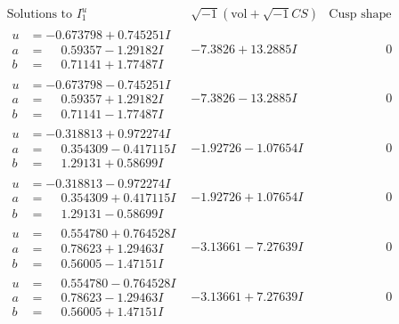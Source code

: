 \documentclass[1p]{elsarticle_modified}
\theoremstyle{definition}
\newcommand{\I}{\sqrt{-1}}
\begin{document}
$$\begin{array}{c|c|c}  
\text{Solutions to }I^u_{1}& \I (\text{vol} + \sqrt{-1}CS) & \text{Cusp shape}\\
 \hline 
\begin{aligned}
u &= -0.673798 + 0.745251 I \\
a &= \phantom{-}0.59357 - 1.29182 I \\
b &= \phantom{-}0.71141 + 1.77487 I\end{aligned}
 & -7.3826 + 13.2885 I & \phantom{-0.000000 } 0 \\ \hline\begin{aligned}
u &= -0.673798 - 0.745251 I \\
a &= \phantom{-}0.59357 + 1.29182 I \\
b &= \phantom{-}0.71141 - 1.77487 I\end{aligned}
 & -7.3826 - 13.2885 I & \phantom{-0.000000 } 0 \\ \hline\begin{aligned}
u &= -0.318813 + 0.972274 I \\
a &= \phantom{-}0.354309 - 0.417115 I \\
b &= \phantom{-}1.29131 + 0.58699 I\end{aligned}
 & -1.92726 - 1.07654 I & \phantom{-0.000000 } 0 \\ \hline\begin{aligned}
u &= -0.318813 - 0.972274 I \\
a &= \phantom{-}0.354309 + 0.417115 I \\
b &= \phantom{-}1.29131 - 0.58699 I\end{aligned}
 & -1.92726 + 1.07654 I & \phantom{-0.000000 } 0 \\ \hline\begin{aligned}
u &= \phantom{-}0.554780 + 0.764528 I \\
a &= \phantom{-}0.78623 + 1.29463 I \\
b &= \phantom{-}0.56005 - 1.47151 I\end{aligned}
 & -3.13661 - 7.27639 I & \phantom{-0.000000 } 0 \\ \hline\begin{aligned}
u &= \phantom{-}0.554780 - 0.764528 I \\
a &= \phantom{-}0.78623 - 1.29463 I \\
b &= \phantom{-}0.56005 + 1.47151 I\end{aligned}
 & -3.13661 + 7.27639 I & \phantom{-0.000000 } 0 \\ \hline\begin{aligned}

\end{aligned}
\end{array}$$
\end{document}

